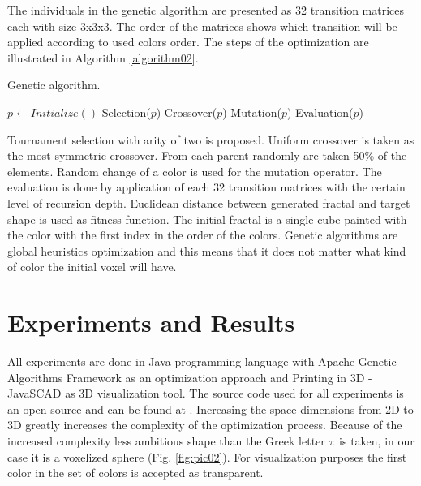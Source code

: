 \documentclass{llncs}
\begin{document}
The individuals in the genetic algorithm are presented as 32 transition matrices each with size 3x3x3. The order of the matrices shows which transition will be applied according to used colors order. The steps of the optimization are illustrated in Algorithm \ref{algorithm02}. 

\begin{algorithm}
\caption{Genetic algorithm.}\label{algorithm02}
\begin{algorithmic}[1]
\State $p \gets Initialize()$
  \State Selection($p$)
  \State Crossover($p$)
  \State Mutation($p$)
  \State Evaluation($p$)
\EndWhile
\EndProcedure
\end{algorithmic}
\end{algorithm}
\FloatBarrier

Tournament selection with arity of two is proposed. Uniform crossover is taken as the most symmetric crossover. From each parent randomly are taken 50\% of the elements. Random change of a color is used for the mutation operator. The evaluation is done by application of each 32 transition matrices with the certain level of recursion depth. Euclidean distance between generated fractal and target shape is used as fitness function. The initial fractal is a single cube painted with the color with the first index in the order of the colors. Genetic algorithms are global heuristics optimization and this means that it does not matter what kind of color the initial voxel will have. 

\section{Experiments and Results} \label{Experiments and Results}

All experiments are done in Java programming language with Apache Genetic Algorithms Framework \cite{apache01} as an optimization approach and Printing in 3D - JavaSCAD \cite{printing01} as 3D visualization tool. The source code used for all experiments is an open source and can be found at \cite{balabanov01}. Increasing the space dimensions from 2D to 3D greatly increases the complexity of the optimization process. Because of the increased complexity less ambitious shape than the Greek letter $\pi$ is taken, in our case it is a voxelized sphere (Fig. \ref{fig:pic02}). For visualization purposes the first color in the set of colors is accepted as transparent. 
\end{document}
